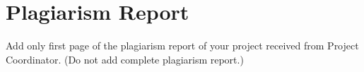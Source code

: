 \chapter{Plagiarism Report}

Add only first page of the plagiarism report of your project received from Project Coordinator.
(Do not add complete plagiarism report.)
